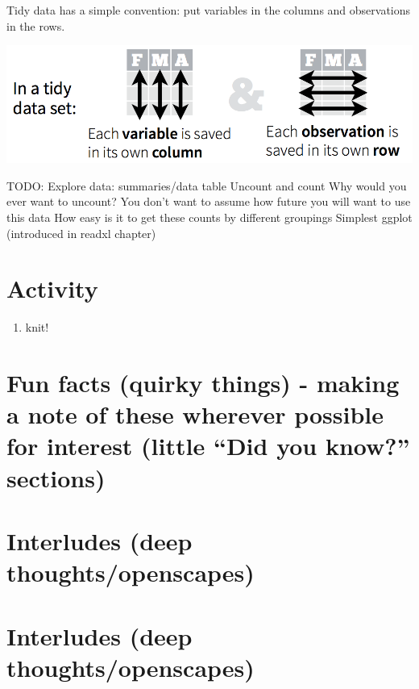 \documentclass[]{book}
\providecommand{\tightlist}{%
  \setlength{\itemsep}{0pt}\setlength{\parskip}{0pt}}
\begin{document}
Tidy data has a simple convention: put variables in the columns and observations in the rows.

\includegraphics[width=0.8\linewidth]{img/tidy_data}

TODO:
Explore data:
summaries/data table
Uncount and count
Why would you ever want to uncount? You don't want to assume how future you will want to use this data
How easy is it to get these counts by different groupings
Simplest ggplot (introduced in readxl chapter)

\hypertarget{activity-4}{%
\section{Activity}\label{activity-4}}

\begin{enumerate}
\def\labelenumi{\arabic{enumi}.}
\tightlist
\item
  knit!
\end{enumerate}

\hypertarget{fun-facts-quirky-things---making-a-note-of-these-wherever-possible-for-interest-little-did-you-know-sections}{%
\section{Fun facts (quirky things) - making a note of these wherever possible for interest (little ``Did you know?'' sections)}\label{fun-facts-quirky-things---making-a-note-of-these-wherever-possible-for-interest-little-did-you-know-sections}}

\hypertarget{interludes-deep-thoughtsopenscapes-1}{%
\section{Interludes (deep thoughts/openscapes)}\label{interludes-deep-thoughtsopenscapes-1}}

\hypertarget{interludes-deep-thoughtsopenscapes-2}{%
\section{Interludes (deep thoughts/openscapes)}\label{interludes-deep-thoughtsopenscapes-2}}
\end{document}
